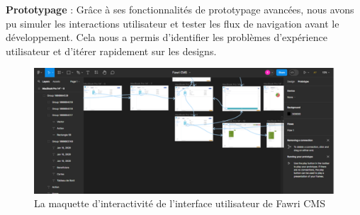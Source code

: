 \textbf{Prototypage} : Grâce à ses fonctionnalités de prototypage avancées, nous avons pu simuler les interactions utilisateur et tester les flux de navigation avant le développement. Cela nous a permis d'identifier les problèmes d'expérience utilisateur et d'itérer rapidement sur les designs.
\\
\begin{figure}[H]
  \centering
  \includegraphics[width=17cm]{Figures/figma.PNG}
  \caption{La maquette d'interactivité de l'interface utilisateur de Fawri CMS}
\end{figure}





















